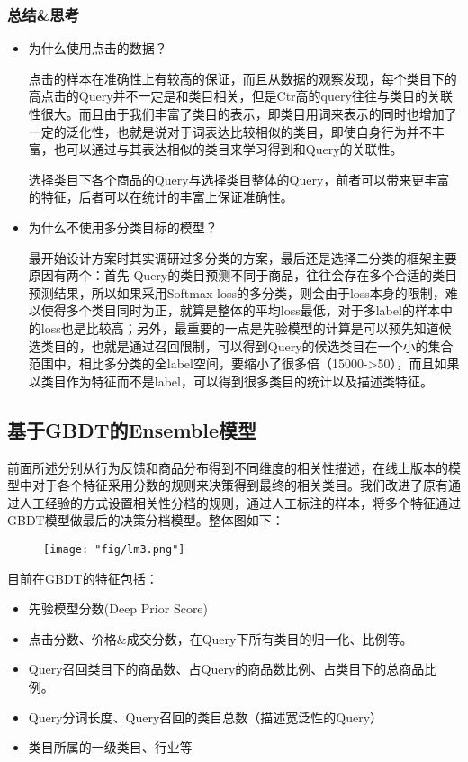 \subsubsection{总结\&思考}
\begin{itemize}
\item 为什么使用点击的数据？
\par 点击的样本在准确性上有较高的保证，而且从数据的观察发现，每个类目下的高点击的Query并不一定是和类目相关，但是Ctr高的query往往与类目的关联性很大。而且由于我们丰富了类目的表示，即类目用词来表示的同时也增加了一定的泛化性，也就是说对于词表达比较相似的类目，即使自身行为并不丰富，也可以通过与其表达相似的类目来学习得到和Query的关联性。
\par 选择类目下各个商品的Query与选择类目整体的Query，前者可以带来更丰富的特征，后者可以在统计的丰富上保证准确性。
\item 为什么不使用多分类目标的模型？
\par 最开始设计方案时其实调研过多分类的方案，最后还是选择二分类的框架主要原因有两个：首先 Query的类目预测不同于商品，往往会存在多个合适的类目预测结果，所以如果采用Softmax loss的多分类，则会由于loss本身的限制，难以使得多个类目同时为正，就算是整体的平均loss最低，对于多label的样本中的loss也是比较高；另外，最重要的一点是先验模型的计算是可以预先知道候选类目的，也就是通过召回限制，可以得到Query的候选类目在一个小的集合范围中，相比多分类的全label空间，要缩小了很多倍（15000->50），而且如果以类目作为特征而不是label，可以得到很多类目的统计以及描述类特征。
\end{itemize}
\subsection{基于GBDT的Ensemble模型}
前面所述分别从行为反馈和商品分布得到不同维度的相关性描述，在线上版本的模型中对于各个特征采用分数的规则来决策得到最终的相关类目。我们改进了原有通过人工经验的方式设置相关性分档的规则，通过人工标注的样本，将多个特征通过GBDT模型做最后的决策分档模型。整体图如下：
\begin{figure}[!h]
	\centering
	\texttt{[image: "fig/lm3.png"]}
	\caption{}
	\label{fig:lm3}
\end{figure}
目前在GBDT的特征包括：
\begin{itemize}
\item 先验模型分数(Deep Prior Score)
\item 点击分数、价格\&成交分数，在Query下所有类目的归一化、比例等。
\item Query召回类目下的商品数、占Query的商品数比例、占类目下的总商品比例。
\item Query分词长度、Query召回的类目总数（描述宽泛性的Query）
\item 类目所属的一级类目、行业等
\end{itemize}
